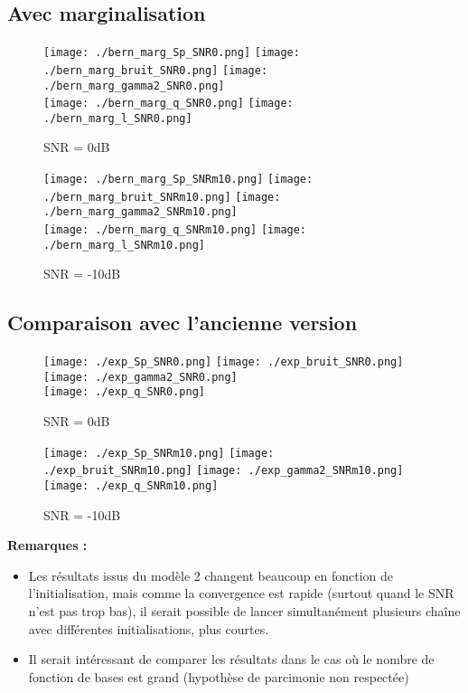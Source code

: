 \documentclass[ 12pt]{article}
\begin{document}
\subsection{Avec marginalisation}
\begin{figure}[H]
\centering
	\texttt{[image: ./bern\_marg\_Sp\_SNR0.png]}
	 \texttt{[image: ./bern\_marg\_bruit\_SNR0.png]}
	\texttt{[image: ./bern\_marg\_gamma2\_SNR0.png]}\\
	\texttt{[image: ./bern\_marg\_q\_SNR0.png]}
	\texttt{[image: ./bern\_marg\_l\_SNR0.png]}
	\caption{SNR = 0dB}
\end{figure}
\begin{figure}[H]
\centering
	\texttt{[image: ./bern\_marg\_Sp\_SNRm10.png]}
	 \texttt{[image: ./bern\_marg\_bruit\_SNRm10.png]}
	\texttt{[image: ./bern\_marg\_gamma2\_SNRm10.png]}\\
	\texttt{[image: ./bern\_marg\_q\_SNRm10.png]}
	\texttt{[image: ./bern\_marg\_l\_SNRm10.png]}
	\caption{SNR = -10dB}
\end{figure}

\newpage
\subsection{Comparaison avec l'ancienne version}
\begin{figure}[H]
\centering
	\texttt{[image: ./exp\_Sp\_SNR0.png]}
	 \texttt{[image: ./exp\_bruit\_SNR0.png]}
	\texttt{[image: ./exp\_gamma2\_SNR0.png]}\\
	\texttt{[image: ./exp\_q\_SNR0.png]}
	\caption{SNR = 0dB}
\end{figure}
\begin{figure}[H]
\centering
	\texttt{[image: ./exp\_Sp\_SNRm10.png]}
	 \texttt{[image: ./exp\_bruit\_SNRm10.png]}
	\texttt{[image: ./exp\_gamma2\_SNRm10.png]}\\
	\texttt{[image: ./exp\_q\_SNRm10.png]}
	\caption{SNR = -10dB}
\end{figure}
%


\textbf{Remarques : }
\begin{itemize}
        \item Les résultats issus du modèle 2 changent beaucoup en fonction de l'initialisation, mais comme la convergence est rapide (surtout quand le SNR n'est pas trop bas), il serait possible de lancer simultanément plusieurs chaîne avec différentes initialisations, plus courtes.
        \item Il serait intéressant de comparer les résultats dans le cas où le nombre de fonction de bases est grand (hypothèse de parcimonie non respectée)
\end{itemize}






\end{document}
